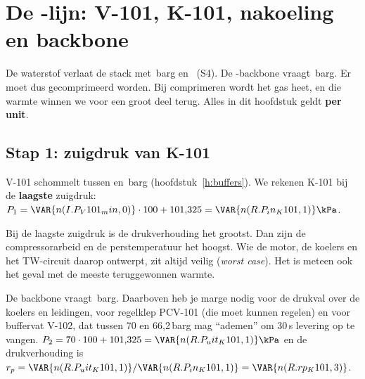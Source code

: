 \chapter{De \HH-lijn: V-101, K-101, nakoeling en backbone}
\label{h:h2}
De waterstof verlaat de stack met \,barg en \degC\ (S4). De \HH-backbone vraagt
\,barg. Er moet dus gecomprimeerd worden. Bij comprimeren wordt het gas heet, en die warmte
winnen we voor een groot deel terug. Alles in dit hoofdstuk geldt \textbf{per unit}.

\section{Stap 1: zuigdruk van K-101}
V-101 schommelt tussen  en \,barg (hoofdstuk~\ref{h:buffers}). We
rekenen K-101 bij de \textbf{laagste} zuigdruk: $P_1 = \VAR{n(I.P_V101_min,0)}\cdot100 + 101{,}325 = \VAR{n(R.P_in_K101,1)}\kPa$.
\begin{waarom}
Bij de laagste zuigdruk is de drukverhouding het grootst. Dan zijn de compressorarbeid en de perstemperatuur het
hoogst. Wie de motor, de koelers en het TW-circuit daarop ontwerpt, zit altijd veilig (\emph{worst case}). Het is
meteen ook het geval met de meeste teruggewonnen warmte.
\end{waarom}
\begin{waarom}
De backbone vraagt \,barg. Daarboven heb je marge nodig voor de drukval over de koelers en
leidingen, voor regelklep PCV-101 (die moet kunnen regelen) en voor buffervat V-102, dat tussen 70 en 66,2\,barg
mag ``ademen'' om 30\,s levering op te vangen. $P_2 = 70\cdot100+101{,}325 = \VAR{n(R.P_uit_K101,1)}\kPa$ en de
drukverhouding is $r_p = \VAR{n(R.P_uit_K101,1)}/\VAR{n(R.P_in_K101,1)} = \VAR{n(R.rp_K101,3)}$.
\end{waarom}

